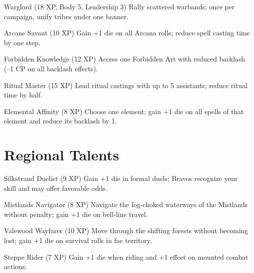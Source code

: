 \documentclass[11pt]{article}
\begin{document}
\begin{talentbox}{Warglord (18 XP, Body 5, Leadership 3)}
Rally scattered warbands; once per campaign, unify tribes under one banner.
\end{talentbox}

\begin{talentbox}{Arcane Savant (10 XP)}
Gain +1 die on all Arcana rolls; reduce spell casting time by one step.
\end{talentbox}

\begin{talentbox}{Forbidden Knowledge (12 XP)}
Access one Forbidden Art with reduced backlash (–1 CP on all backlash effects).
\end{talentbox}

\begin{talentbox}{Ritual Master (15 XP)}
Lead ritual castings with up to 5 assistants; reduce ritual time by half.
\end{talentbox}

\begin{talentbox}{Elemental Affinity (8 XP)}
Choose one element; gain +1 die on all spells of that element and reduce its backlash by 1.
\end{talentbox}

\section*{Regional Talents}

\begin{talentbox}{Silkstrand Duelist (9 XP)}
Gain +1 die in formal duels; Bravos recognize your skill and may offer favorable odds.
\end{talentbox}

\begin{talentbox}{Mistlands Navigator (8 XP)}
Navigate the fog-choked waterways of the Mistlands without penalty; gain +1 die on bell-line travel.
\end{talentbox}

\begin{talentbox}{Valewood Wayfarer (10 XP)}
Move through the shifting forests without becoming lost; gain +1 die on survival rolls in fae territory.
\end{talentbox}

\begin{talentbox}{Steppe Rider (7 XP)}
Gain +1 die when riding and +1 effect on mounted combat actions.
\end{talentbox}
\end{document}
